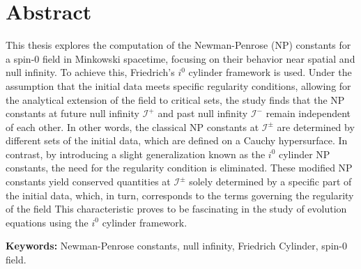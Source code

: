 
\section*{Abstract}


This thesis explores the computation of the Newman-Penrose (NP) constants for a spin-0 field in Minkowski spacetime, focusing on their behavior near spatial and null infinity. To achieve this, Friedrich's $i^0$ cylinder framework is used. Under the assumption that the initial data meets specific regularity conditions, allowing for the analytical extension of the field to critical sets, the study finds that the NP constants at future null infinity $\mathscr{I}^{+}$ and past null infinity $\mathscr{I}^{-}$ remain independent of each other. In other words, the classical NP constants at $\mathscr{I}^{\pm}$ are determined by different sets of the initial data, which are defined on a Cauchy hypersurface.
In contrast, by introducing a slight generalization known as the $i^0$ cylinder NP constants, the need for the regularity condition is eliminated. These modified NP constants yield conserved quantities at $\mathscr{I}^{\pm}$ solely determined by a specific part of the initial data, which, in turn, corresponds to the terms governing the regularity of the field This characteristic proves to be fascinating in the study of evolution equations using the $i^0$ cylinder framework.

\vfill

\textbf{\Large Keywords:} Newman-Penrose constants, null infinity, Friedrich Cylinder, spin-0 field.

